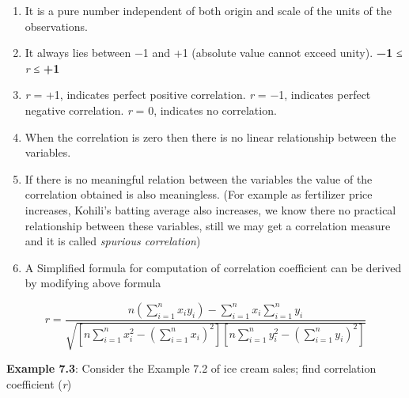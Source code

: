 \documentclass[
]{book}
\begin{document}
\begin{enumerate}
\def\labelenumi{\arabic{enumi}.}
\item
  It is a pure number independent of both origin and scale of the
  units of the observations.
\item
  It always lies between −1 and +1 (absolute value cannot exceed
  unity). \textbf{−1} ≤ \emph{r} ≤ \textbf{+1}
\item
  \emph{r} = +1, indicates perfect positive correlation. \emph{r} = −1,
  indicates perfect negative correlation. \emph{r} = 0, indicates no
  correlation.
\item
  When the correlation is zero then there is no linear relationship
  between the variables.
\item
  If there is no meaningful relation between the variables the value
  of the correlation obtained is also meaningless. (For example as
  fertilizer price increases, Kohili's batting average also increases,
  we know there no practical relationship between these variables,
  still we may get a correlation measure and it is called \emph{spurious
  correlation})
\item
  A Simplified formula for computation of correlation coefficient can
  be derived by modifying above formula
\end{enumerate}

\[r = \frac{n\left( \sum_{i = 1}^{n}{x_{i}y_{i}} \right) - \sum_{i = 1}^{n}{x_{i}\sum_{i = 1}^{n}y_{i}}}{\sqrt{\left\lbrack n\sum_{i = 1}^{n}{x_{i}^{2} - \left( \sum_{i = 1}^{n}x_{i} \right)^{2}} \right\rbrack\left\lbrack n\sum_{i = 1}^{n}{y_{i}^{2} - \left( \sum_{i = 1}^{n}y_{i} \right)^{2}} \right\rbrack}}\]

\textbf{Example 7.3}: Consider the Example 7.2 of ice cream sales; find
correlation coefficient (\emph{r})
\end{document}
